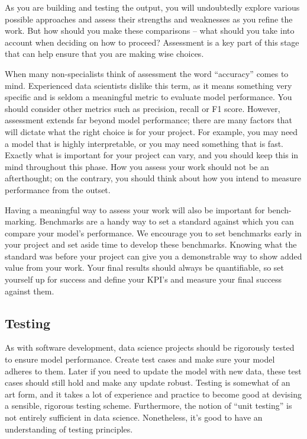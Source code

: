 \documentclass[
]{book}
\begin{document}
As you are building and testing the output, you will undoubtedly explore various possible approaches and assess their strengths and weaknesses as you refine the work. But how should you make these comparisons -- what should you take into account when deciding on how to proceed? Assessment is a key part of this stage that can help ensure that you are making wise choices.

When many non-specialists think of assessment the word ``accuracy'' comes to mind. Experienced data scientists dislike this term, as it means something very specific and is seldom a meaningful metric to evaluate model performance. You should consider other metrics such as precision, recall or F1 score. However, assessment extends far beyond model performance; there are many factors that will dictate what the right choice is for your project. For example, you may need a model that is highly interpretable, or you may need something that is fast. Exactly what is important for your project can vary, and you should keep this in mind throughout this phase. How you assess your work should not be an afterthought; on the contrary, you should think about how you intend to measure performance from the outset.

Having a meaningful way to assess your work will also be important for bench-marking. Benchmarks are a handy way to set a standard against which you can compare your model's performance. We encourage you to set benchmarks early in your project and set aside time to develop these benchmarks. Knowing what the standard was before your project can give you a demonstrable way to show added value from your work. Your final results should always be quantifiable, so set yourself up for success and define your KPI's and measure your final success against them.

\hypertarget{testing}{%
\subsection{Testing}\label{testing}}

As with software development, data science projects should be rigorously tested to ensure model performance. Create test cases and make sure your model adheres to them. Later if you need to update the model with new data, these test cases should still hold and make any update robust. Testing is somewhat of an art form, and it takes a lot of experience and practice to become good at devising a sensible, rigorous testing scheme. Furthermore, the notion of ``unit testing'' is not entirely sufficient in data science. Nonetheless, it's good to have an understanding of testing principles.
\end{document}

